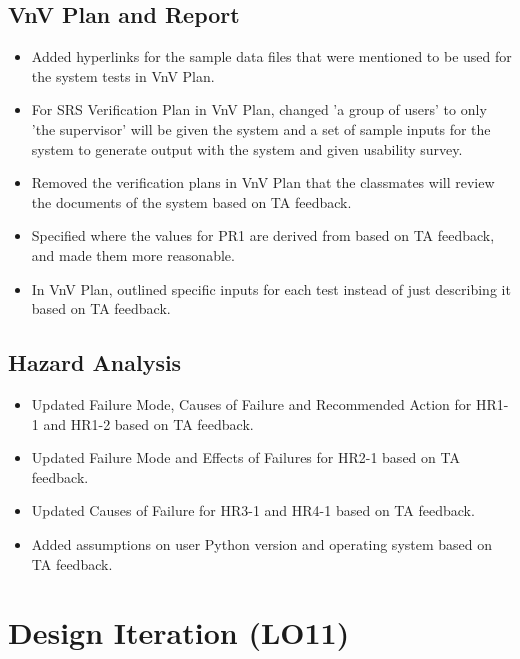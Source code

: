 \documentclass{article}
\begin{document}
\begin{itemize}
\end{itemize}

\subsection{VnV Plan and Report}
\begin{itemize}
    \item Added hyperlinks for the sample data files that were mentioned to be used for the system tests in VnV Plan.
    \item For SRS Verification Plan in VnV Plan, changed 'a group of users' to only 'the supervisor' will be given the system and a set of sample inputs for the system to generate output with the system and given usability survey.
    \item Removed the verification plans in VnV Plan that the classmates will review the documents of the system based on TA feedback.
    \item Specified where the values for PR1 are derived from based on TA feedback, and made them more reasonable.
    \item In VnV Plan, outlined specific inputs for each test instead of just describing it based on TA feedback.
\end{itemize}

\subsection{Hazard Analysis}
\begin{itemize}
    \item Updated Failure Mode, Causes of Failure and Recommended Action for HR1-1 and HR1-2 based on TA feedback.
    \item Updated Failure Mode and Effects of Failures for HR2-1 based on TA feedback.
    \item Updated Causes of Failure for HR3-1 and HR4-1 based on TA feedback.
    \item Added assumptions on user Python version and operating system based on TA feedback. 
\end{itemize}
\section{Design Iteration (LO11)}
\end{document}
